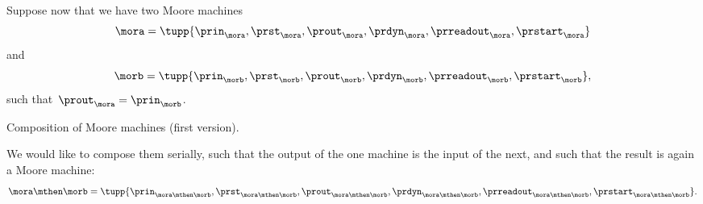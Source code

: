     Suppose now that we have two Moore machines
    \begin{equation}
        \label{eq:moore-mora}
        \mora = \tupp{\prin_{\mora},\prst_{\mora},\prout_{\mora},\prdyn_{\mora},\prreadout_{\mora},\prstart_{\mora}}
    \end{equation}
    and
    \begin{equation}
        \label{eq:moore-morb}
        \morb = \tupp{\prin_{\morb},\prst_{\morb},\prout_{\morb},\prdyn_{\morb},\prreadout_{\morb},\prstart_{\morb}},
    \end{equation}
    such that~$\prout_{\mora} = \prin_{\morb}$.
    \begin{marginfigure}
        \centering
        \caption{Composition of Moore machines (first version).}
        \label{fig:comp_moore_1}
    \end{marginfigure}

We would like to compose them serially, such that the output of the one machine is the input of the next, and such that the result is again a Moore machine:
\begin{equation}
\mora \mthen \morb = \tupp{\prin_{\mora \mthen \morb},\prst_{\mora \mthen \morb},\prout_{\mora \mthen \morb},\prdyn_{\mora \mthen \morb},\prreadout_{\mora \mthen \morb},\prstart_{\mora \mthen \morb}}.
\end{equation}

